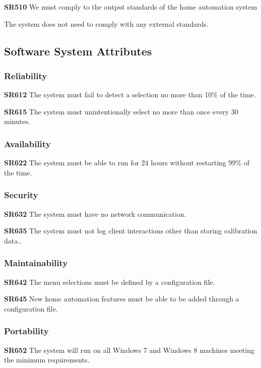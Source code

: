 \documentclass{article}
\begin{document}
\textbf{SR510} We must comply to the output standards of the home automation system


The system does not need to comply with any external standards.

\subsection{Software System Attributes}

\subsubsection{Reliability} 

\textbf{SR612} The system must fail to detect a selection no more than 10\% of
the time.

\textbf{SR615} The system must unintentionally select no more than once every
30 minutes.

\subsubsection{Availability}

\textbf{SR622} The system must be able to run for 24 hours without restarting
99\% of the time.

\subsubsection{Security}

\textbf{SR632} The system must have no network communication.

\textbf{SR635} The system must not log client interactions other than storing
calibration data..

\subsubsection{Maintainability}

\textbf{SR642} The menu selections must be defined by a configuration file.

\textbf{SR645} New home automation features must be able to be added through a
configuration file.

\subsubsection{Portability}

\textbf{SR652} The system will run on all Windows 7 and Windows 8 machines
meeting the minimum requirements.
\end{document}
